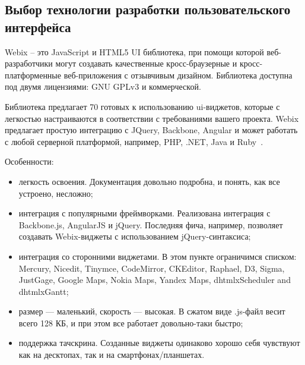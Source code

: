 \subsection{Выбор технологии разработки пользовательского интерфейса}
\label{sec:modeling:ui_technology}

Webix -- это JavaScript и HTML5 UI библиотека, при помощи которой веб-разработчики могут создавать качественные кросс-браузерные и кросс-платформенные веб-приложения с отзывчивым дизайном. Библиотека доступна под двумя лицензиями: GNU GPLv3 и коммерческой.

Библиотека предлагает 70 готовых к использованию ui-виджетов, которые с легкостью настраиваются в соответствии с требованиями вашего проекта. Webix предлагает простую интеграцию с JQuery, Backbone, Angular и может работать с любой серверной платформой, например, PHP, .NET, Java и Ruby~\cite{what_is_webix}.

Особенности:

\begin{itemize}
    \item легкость освоения. Документация довольно подробна, и понять, как все устроено, несложно;
    \item интеграция с популярными фреймворками. Реализована интеграция с Backbone.js, AngularJS и jQuery. Последняя фича, например, позволяет создавать Webix-виджеты с использованием jQuery-синтаксиса;
    \item интеграция со сторонними виджетами. В этом пункте ограничимся списком: Mercury, Nicedit, Tinymce, CodeMirror, CKEditor, Raphael, D3, Sigma, JustGage, Google Maps, Nokia Maps, Yandex Maps, dhtmlxScheduler and dhtmlxGantt;
    \item размер — маленький, скорость — высокая. В сжатом виде .js-файл весит всего 128 КБ, и при этом все работает довольно-таки быстро;
    \item поддержка тачскрина. Созданные виджеты одинаково хорошо себя чувствуют как на десктопах, так и на смартфонах/планшетах.
\end{itemize}

